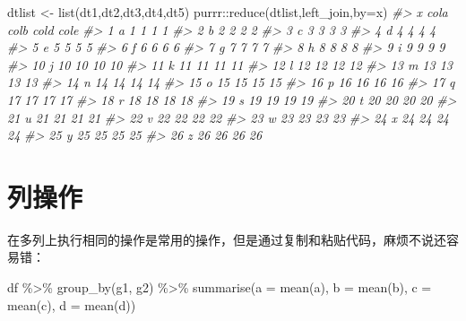 \documentclass[
]{book}
\newenvironment{Shaded}{\begin{snugshade}}{\end{snugshade}}
\newcommand{\AttributeTok}[1]{\textcolor[rgb]{0.77,0.63,0.00}{#1}}
\newcommand{\CommentTok}[1]{\textcolor[rgb]{0.56,0.35,0.01}{\textit{#1}}}
\newcommand{\FunctionTok}[1]{\textcolor[rgb]{0.00,0.00,0.00}{#1}}
\newcommand{\NormalTok}[1]{#1}
\newcommand{\OtherTok}[1]{\textcolor[rgb]{0.56,0.35,0.01}{#1}}
\newcommand{\SpecialCharTok}[1]{\textcolor[rgb]{0.00,0.00,0.00}{#1}}
\newcommand{\StringTok}[1]{\textcolor[rgb]{0.31,0.60,0.02}{#1}}
\begin{document}
\begin{Shaded}
\begin{Highlighting}[]
\NormalTok{dtlist }\OtherTok{\textless{}{-}} \FunctionTok{list}\NormalTok{(dt1,dt2,dt3,dt4,dt5)}
\NormalTok{purrr}\SpecialCharTok{::}\FunctionTok{reduce}\NormalTok{(dtlist,left\_join,}\AttributeTok{by=}\StringTok{\textquotesingle{}x\textquotesingle{}}\NormalTok{)}
\CommentTok{\#\textgreater{}    x cola colb cold cole}
\CommentTok{\#\textgreater{} 1  a    1    1    1    1}
\CommentTok{\#\textgreater{} 2  b    2    2    2    2}
\CommentTok{\#\textgreater{} 3  c    3    3    3    3}
\CommentTok{\#\textgreater{} 4  d    4    4    4    4}
\CommentTok{\#\textgreater{} 5  e    5    5    5    5}
\CommentTok{\#\textgreater{} 6  f    6    6    6    6}
\CommentTok{\#\textgreater{} 7  g    7    7    7    7}
\CommentTok{\#\textgreater{} 8  h    8    8    8    8}
\CommentTok{\#\textgreater{} 9  i    9    9    9    9}
\CommentTok{\#\textgreater{} 10 j   10   10   10   10}
\CommentTok{\#\textgreater{} 11 k   11   11   11   11}
\CommentTok{\#\textgreater{} 12 l   12   12   12   12}
\CommentTok{\#\textgreater{} 13 m   13   13   13   13}
\CommentTok{\#\textgreater{} 14 n   14   14   14   14}
\CommentTok{\#\textgreater{} 15 o   15   15   15   15}
\CommentTok{\#\textgreater{} 16 p   16   16   16   16}
\CommentTok{\#\textgreater{} 17 q   17   17   17   17}
\CommentTok{\#\textgreater{} 18 r   18   18   18   18}
\CommentTok{\#\textgreater{} 19 s   19   19   19   19}
\CommentTok{\#\textgreater{} 20 t   20   20   20   20}
\CommentTok{\#\textgreater{} 21 u   21   21   21   21}
\CommentTok{\#\textgreater{} 22 v   22   22   22   22}
\CommentTok{\#\textgreater{} 23 w   23   23   23   23}
\CommentTok{\#\textgreater{} 24 x   24   24   24   24}
\CommentTok{\#\textgreater{} 25 y   25   25   25   25}
\CommentTok{\#\textgreater{} 26 z   26   26   26   26}
\end{Highlighting}
\end{Shaded}

\hypertarget{dplyr-column-manipulation}{%
\section{列操作}\label{dplyr-column-manipulation}}

在多列上执行相同的操作是常用的操作，但是通过复制和粘贴代码，麻烦不说还容易错：

\begin{Shaded}
\begin{Highlighting}[]
\NormalTok{df }\SpecialCharTok{\%\textgreater{}\%} 
  \FunctionTok{group\_by}\NormalTok{(g1, g2) }\SpecialCharTok{\%\textgreater{}\%} 
  \FunctionTok{summarise}\NormalTok{(}\AttributeTok{a =} \FunctionTok{mean}\NormalTok{(a), }\AttributeTok{b =} \FunctionTok{mean}\NormalTok{(b), }\AttributeTok{c =} \FunctionTok{mean}\NormalTok{(c), }\AttributeTok{d =} \FunctionTok{mean}\NormalTok{(d))}
\end{Highlighting}
\end{Shaded}
\end{document}
